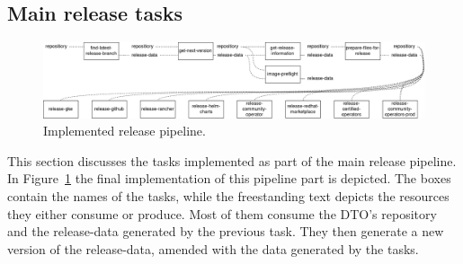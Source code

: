 \subsection{Main release tasks}\label{subsec:main-release-tasks}

\begin{figure}[H]
    \centering
    \includegraphics[width=\textwidth]{img/implementation/release-pipeline.drawio}
    \caption{Implemented release pipeline.}
    \label{fig:implemented-release-pipeline}
\end{figure}

This section discusses the tasks implemented as part of the main release pipeline.
In Figure~\ref{fig:implemented-release-pipeline} the final implementation of this pipeline part is depicted.
The boxes contain the names of the tasks, while the freestanding text depicts the resources they either consume or produce.
Most of them consume the DTO's repository and the release-data generated by the previous task.
They then generate a new version of the release-data, amended with the data generated by the tasks.



\pagebreak



\pagebreak




















